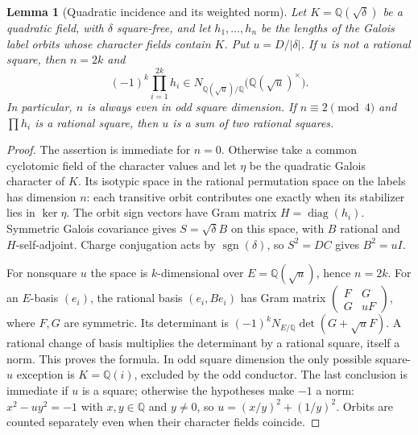 \documentclass[11pt]{amsart}
\numberwithin{equation}{section}
\newtheorem{lemma}[theorem]{Lemma}
\theoremstyle{definition}
\theoremstyle{plain}
\newcommand{\QQ}{\mathbb Q}
\begin{document}
\begin{lemma}[Quadratic incidence and its weighted norm]
\label{odd:quadratic-incidence}\label{new:quadratic-weighted-norm}
Let $K=\QQ(\sqrt\delta)$ be a quadratic field, with $\delta$
square-free, and let $h_1,\ldots,h_n$ be the lengths of the Galois label orbits whose
character fields contain $K$. Put $u=D/|\delta|$.
If $u$ is not a rational square, then $n=2k$ and
\[
 (-1)^k\prod_{i=1}^{2k}h_i
       \in N_{\QQ(\sqrt u)/\QQ}\bigl(\QQ(\sqrt u)^\times\bigr).
\]
In particular, $n$ is always even in odd square dimension.
If $n\equiv2\pmod4$ and $\prod h_i$ is a rational square,
then $u$ is a sum of two rational squares.
\end{lemma}
\begin{proof}
The assertion is immediate for $n=0$. Otherwise take a common
cyclotomic field of the character values and let $\eta$ be the
quadratic Galois character of $K$. Its isotypic space in the
rational permutation space on the labels has dimension $n$:
each transitive orbit contributes one exactly when its stabilizer
lies in $\ker\eta$. The orbit sign vectors have Gram matrix
$H=\operatorname{diag}(h_i)$. Symmetric Galois covariance gives
$S=\sqrt\delta B$ on this space, with $B$ rational and
$H$-self-adjoint. Charge conjugation acts by
$\operatorname{sgn}(\delta)$, so $S^2=DC$ gives $B^2=uI$.

For nonsquare $u$ the space is $k$-dimensional over
$E=\QQ(\sqrt u)$, hence $n=2k$. For an $E$-basis $(e_i)$,
the rational basis $(e_i,Be_i)$ has Gram matrix
$\left(\begin{smallmatrix}F&G\\G&uF\end{smallmatrix}\right)$,
where $F,G$ are symmetric. Its determinant is
$(-1)^kN_{E/\QQ}\det(G+\sqrt uF)$. A rational change of basis
multiplies the determinant by a rational square, itself a norm.
This proves the formula. In odd square dimension the only possible
square-$u$ exception is $K=\QQ(i)$, excluded by the odd conductor.
The last conclusion is immediate if $u$ is a square; otherwise
the hypotheses make $-1$ a norm:
$x^2-uy^2=-1$ with $x,y\in\QQ$ and $y\ne0$, so
$u=(x/y)^2+(1/y)^2$. Orbits are counted separately even when
their character fields coincide.
\end{proof}
\end{document}
